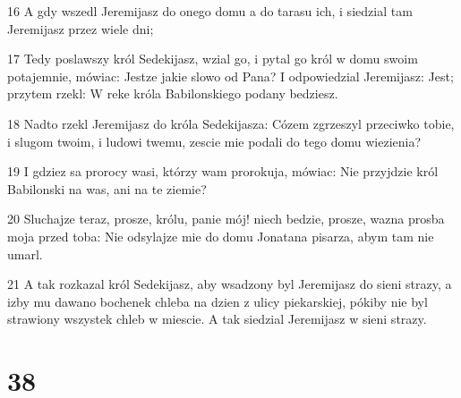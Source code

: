 \par 16 A gdy wszedl Jeremijasz do onego domu a do tarasu ich, i siedzial tam Jeremijasz przez wiele dni;
\par 17 Tedy poslawszy król Sedekijasz, wzial go, i pytal go król w domu swoim potajemnie, mówiac: Jestze jakie slowo od Pana? I odpowiedzial Jeremijasz: Jest; przytem rzekl: W reke króla Babilonskiego podany bedziesz.
\par 18 Nadto rzekl Jeremijasz do króla Sedekijasza: Cózem zgrzeszyl przeciwko tobie, i slugom twoim, i ludowi twemu, zescie mie podali do tego domu wiezienia?
\par 19 I gdziez sa prorocy wasi, którzy wam prorokuja, mówiac: Nie przyjdzie król Babilonski na was, ani na te ziemie?
\par 20 Sluchajze teraz, prosze, królu, panie mój! niech bedzie, prosze, wazna prosba moja przed toba: Nie odsylajze mie do domu Jonatana pisarza, abym tam nie umarl.
\par 21 A tak rozkazal król Sedekijasz, aby wsadzony byl Jeremijasz do sieni strazy, a izby mu dawano bochenek chleba na dzien z ulicy piekarskiej, pókiby nie byl strawiony wszystek chleb w miescie. A tak siedzial Jeremijasz w sieni strazy.

\chapter{38}

